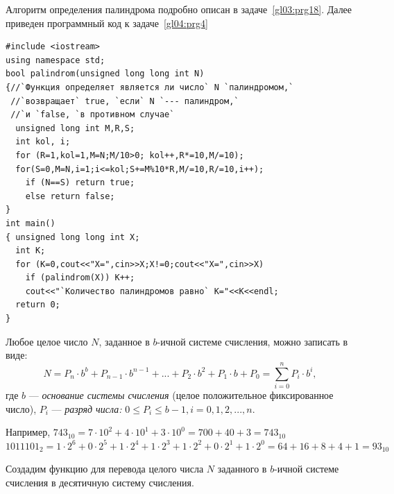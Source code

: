 
Алгоритм определения палиндрома подробно описан в задаче~\ref{gl03:prg18}. 
Далее приведен программный код к задаче~\ref{gl04:prg4}

\begin{lstlisting}
#include <iostream>
using namespace std;
bool palindrom(unsigned long long int N)
{//`Функция определяет является ли число` N `палиндромом,`
 //`возвращает` true, `если` N `--- палиндром,`
 //`и `false, `в противном случае`
  unsigned long int M,R,S; 
  int kol, i;
  for (R=1,kol=1,M=N;M/10>0; kol++,R*=10,M/=10);
  for(S=0,M=N,i=1;i<=kol;S+=M%10*R,M/=10,R/=10,i++);
    if (N==S) return true;
    else return false;
}
int main()
{ unsigned long long int X;
  int K;
  for (K=0,cout<<"X=",cin>>X;X!=0;cout<<"X=",cin>>X)
    if (palindrom(X)) K++;
    cout<<"`Количество палиндромов равно` K="<<K<<endl;
  return 0;
}
\end{lstlisting}


Любое целое число $N$, заданное в $b$-ичной системе счисления, можно записать в 
виде: 
\begin{equation*}
N=P_n\cdot b^b+P_{n-1}\cdot b^{n-1}+...+P_2\cdot b^2+P_1\cdot b+P_0=\sum_{i=0}^n{P_i\cdot b^i},
\end{equation*}
где $b$ --- \emph{основание системы счисления} (целое положительное фиксированное число), 
$P_i$  --- \emph{разряд числа:} 
$0\le P_i\le b-1,i=0,1,2,...,n.$

Например,
$743_{10}=7\cdot 10^{2}+4\cdot 10^{1}+3\cdot 10^{0}=700+40+3=743_{10}$
$1011101_{2}=1\cdot 2^{6}+0\cdot 2^{5}+1\cdot 2^{4}+1\cdot 2^{3}+1\cdot 2^{2}+0\cdot 2^{1}+1\cdot
2^{0}=64+16+8+4+1=93_{10}$

Создадим функцию для перевода целого числа $N$ заданного в
$b$-ичной системе счисления в десятичную систему счисления.

